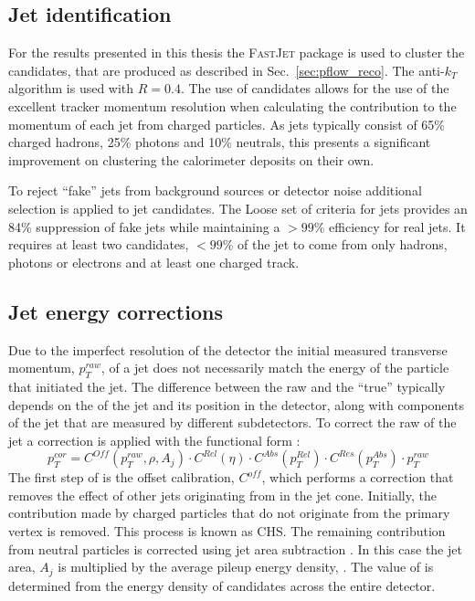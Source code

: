 \subsection{Jet identification}

For the results presented in this thesis the \textsc{FastJet}
\cite{Cacciari2012} package is used to cluster the \PF candidates,
that are produced as described in Sec.~\ref{sec:pflow_reco}. The
anti-$k_T$ algorithm is used with $R=0.4$. The use of \PF candidates
allows for the use of the excellent tracker momentum resolution when
calculating the contribution to the momentum of each jet from charged
particles. As jets typically consist of 65\% charged hadrons, 25\%
photons and 10\% neutrals, this presents a significant improvement on
clustering the calorimeter deposits on their own. 

To reject ``fake'' jets from background sources or detector noise
additional selection is applied to jet candidates. The Loose set of
criteria for jets provides an 84\% suppression of fake jets while
maintaining a $>99\%$ efficiency for real jets. It requires at least
two \PF candidates, $<99\%$ of the jet to come from only hadrons,
photons or electrons and at least one charged track.

\subsection{Jet energy corrections}

Due to the imperfect resolution of the \CMS detector the initial
measured transverse momentum, $p_T^{raw}$, of a jet does not
necessarily match the energy of the particle that initiated the jet.
The difference between the raw \pT and the ``true'' \pT typically
depends on the \pT of the jet and its position in the detector, along
with components of the jet that are measured by different
subdetectors. To correct the raw \pT of the jet a correction is
applied with the functional form
\cite{1748-0221-6-11-P11002}:
\begin{equation}
p_T^{cor}=C^{Off}(p_T^{raw},\rho,A_j)\cdot C^{Rel}(\eta)\cdot
C^{Abs}(p_T^{Rel})\cdot C^{Res}(p_T^{Abs})\cdot p_T^{raw}
\end{equation}
The first step of is the offset calibration, $C^{off}$, which performs a correction
that removes the effect of other jets originating from \PU in the jet
cone. Initially, the contribution made by charged particles that do
not originate from the primary vertex is removed. This process is
known as \ac{CHS}. The remaining contribution from neutral \PU
particles is corrected using jet area subtraction
\cite{Cacciari:2007fd}. In this case the jet area, $A_j$ is multiplied
by the average pileup energy density, \rho. The value of \rho is
determined from the energy density of \PF candidates across the entire
detector.

